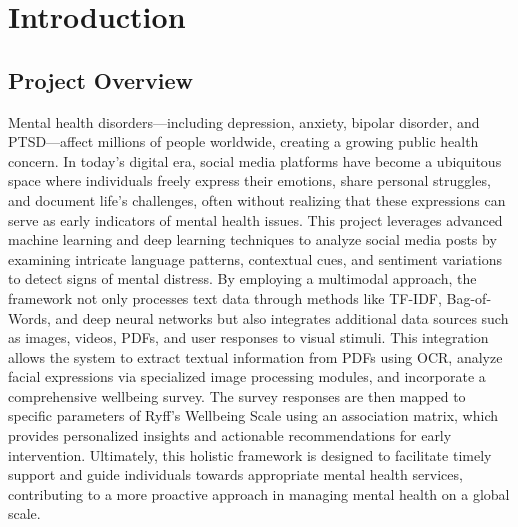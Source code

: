 
\section{Introduction}

\begin{comment}
    Briefly introduce the project's overall topic and purpose.
    \vspace{.1in}
    
    \noindent
    Provide specifications of Technical domain (Hardware, Operating System, Software) and Business domain.
    \vspace{.1in}
    
    \noindent
    Provide \textbf{Glossary} / Keywords in a tabular format.
\end{comment}


\subsection{Project Overview}
\vspace{.1in}
\noindent
Mental health disorders—including depression, anxiety, bipolar disorder, and PTSD—affect millions of people worldwide, creating a growing public health concern. In today’s digital era, social media platforms have become a ubiquitous space where individuals freely express their emotions, share personal struggles, and document life’s challenges, often without realizing that these expressions can serve as early indicators of mental health issues. This project leverages advanced machine learning and deep learning techniques to analyze social media posts by examining intricate language patterns, contextual cues, and sentiment variations to detect signs of mental distress. By employing a multimodal approach, the framework not only processes text data through methods like TF-IDF, Bag-of-Words, and deep neural networks but also integrates additional data sources such as images, videos, PDFs, and user responses to visual stimuli. This integration allows the system to extract textual information from PDFs using OCR, analyze facial expressions via specialized image processing modules, and incorporate a comprehensive wellbeing survey. The survey responses are then mapped to specific parameters of Ryff’s Wellbeing Scale using an association matrix, which provides personalized insights and actionable recommendations for early intervention. Ultimately, this holistic framework is designed to facilitate timely support and guide individuals towards appropriate mental health services, contributing to a more proactive approach in managing mental health on a global scale.

